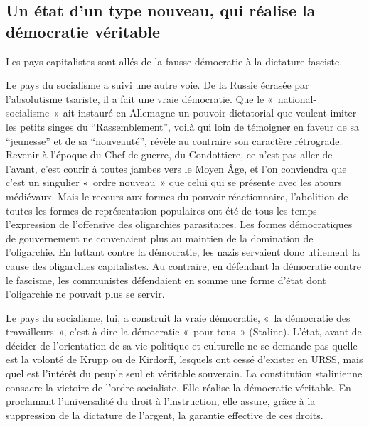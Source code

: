 \documentclass[french,twoside]{book} %
\begin{document}
\subsection[Un état d’un type nouveau, qui réalise la démocratie véritable]{Un état d’un type nouveau, qui réalise la démocratie véritable}
\noindent Les pays capitalistes sont allés de la fausse démocratie à la dictature fasciste.\par
Le pays du socialisme a suivi une autre voie. De la Russie écrasée par l’absolutisme tsariste, il a fait une vraie démocratie. Que le « national-socialisme » ait instauré en Allemagne un pouvoir dictatorial que veulent imiter les petits singes du “Rassemblement”, voilà qui loin de témoigner en faveur de sa “jeunesse” et de sa “nouveauté”, révèle au contraire son caractère rétrograde. Revenir à l’époque du Chef de guerre, du Condottiere, ce n’est pas aller de l’avant, c’est courir à toutes jambes vers le Moyen Âge, et l’on conviendra que c’est un singulier « ordre nouveau » que celui qui se présente avec les atours médiévaux. Mais le recours aux formes du pouvoir réactionnaire, l’abolition de toutes les formes de représentation populaires ont été de tous les temps l’expression de l’offensive des oligarchies parasitaires. Les formes démocratiques de gouvernement ne convenaient plus au maintien de la domination de l’oligarchie. En luttant contre la démocratie, les nazis servaient donc utilement la cause des oligarchies capitalistes. Au contraire, en défendant la démocratie contre le fascisme, les communistes défendaient en somme une forme d’état dont l’oligarchie ne pouvait plus se servir.\par
Le pays du socialisme, lui, a construit la vraie démocratie, « la démocratie des travailleurs », c’est-à-dire la démocratie « pour tous » (Staline). L’état, avant de décider de l’orientation de sa vie politique et culturelle ne se demande pas quelle est la volonté de Krupp ou de Kirdorff, lesquels ont cessé d’exister en URSS, mais quel est l’intérêt du peuple seul et véritable souverain. La constitution stalinienne consacre la victoire de l’ordre socialiste. Elle réalise la démocratie véritable. En proclamant l’universalité du droit à l’instruction, elle assure, grâce à la suppression de la dictature de l’argent, la garantie effective de ces droits.
\end{document}
